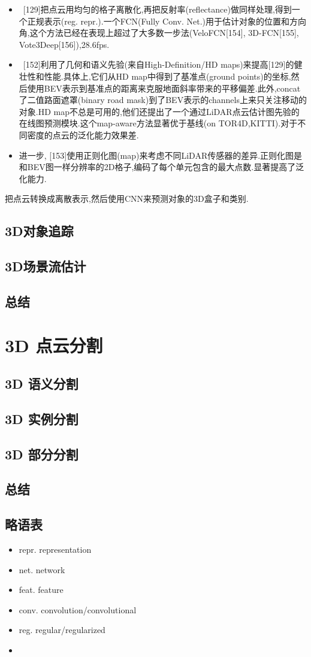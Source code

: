 \documentclass{article}
\begin{document}
\begin{itemize}
    \item \ [129]把点云用均匀的格子离散化,再把反射率(reflectance)做同样处理,得到一个正规表示(reg. repr.).一个FCN(Fully Conv. Net.)用于估计对象的位置和方向角,这个方法已经在表现上超过了大多数一步法(VeloFCN[154], 3D-FCN[155], Vote3Deep[156]),28.6fps.
    \item \ [152]利用了几何和语义先验(来自High-Definition/HD maps)来提高[129]的健壮性和性能.具体上,它们从HD map中得到了基准点(ground points)的坐标,然后使用BEV表示到基准点的距离来克服地面斜率带来的平移偏差.此外,concat了二值路面遮罩(binary road mask)到了BEV表示的channels上来只关注移动的对象.HD map不总是可用的,他们还提出了一个通过LiDAR点云估计图先验的在线图预测模块.这个map-aware方法显著优于基线(on TOR4D,KITTI).对于不同密度的点云的泛化能力效果差.
    \item 进一步, [153]使用正则化图(map)来考虑不同LiDAR传感器的差异.正则化图是和BEV图一样分辨率的2D格子,编码了每个单元包含的最大点数.显著提高了泛化能力.
\end{itemize}

 把点云转换成离散表示,然后使用CNN来预测对象的3D盒子和类别.

\subsection{3D对象追踪}
\subsection{3D场景流估计}
\subsection{总结}

\section{3D 点云分割}

\subsection{3D 语义分割}
\subsection{3D 实例分割}
\subsection{3D 部分分割}
\subsection{总结}

\subsection{略语表}
\begin{itemize}
    \item repr. \trarr representation
    \item net. \trarr network
    \item feat. \trarr feature
    \item conv. \trarr convolution/convolutional
    \item reg. \trarr regular/regularized
    \item 
\end{itemize}
\end{document}
